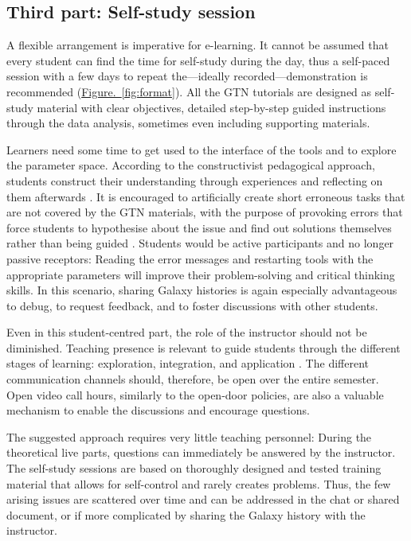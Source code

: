 \subsection*{Third part: Self-study session}
A flexible arrangement is imperative for e-learning. It cannot be assumed that every student can find the time for self-study during the day, thus a self-paced session with a few days to repeat the—ideally recorded—demonstration is recommended (\hyperref[fig:format]{Figure.~\ref{fig:format}}). All the GTN tutorials are designed as self-study material with clear objectives, detailed step-by-step guided instructions through the data analysis, sometimes even including supporting materials.

Learners need some time to get used to the interface of the tools and to explore the parameter space. According to the constructivist pedagogical approach, students construct their understanding through experiences and reflecting on them afterwards \cite{chakraborty2017learner,palloff2003virtual}. It is encouraged to artificially create short erroneous tasks that are not covered by the GTN materials, with the purpose of provoking errors that force students to hypothesise about the issue and find out solutions themselves rather than being guided \cite{lin2001web}. Students would be active participants and no longer passive receptors: Reading the error messages and restarting tools with the appropriate parameters will improve their problem-solving and critical thinking skills. In this scenario, sharing Galaxy histories is again especially advantageous to debug, to request feedback, and to foster discussions with other students.

Even in this student-centred part, the role of the instructor should not be diminished. Teaching presence is relevant to guide students through the different stages of learning: exploration, integration, and application \cite{gorsky2009online}. The different communication channels should, therefore, be open over the entire semester. Open video call hours, similarly to the open-door policies, are also a valuable mechanism to enable the discussions and encourage questions.

The suggested approach requires very little teaching personnel: During the theoretical live parts, questions can immediately be answered by the instructor. The self-study sessions are based on thoroughly designed and tested training material that allows for self-control and rarely creates problems. Thus, the few arising issues are scattered over time and can be addressed in the chat or shared document, or if more complicated by sharing the Galaxy history with the instructor.

